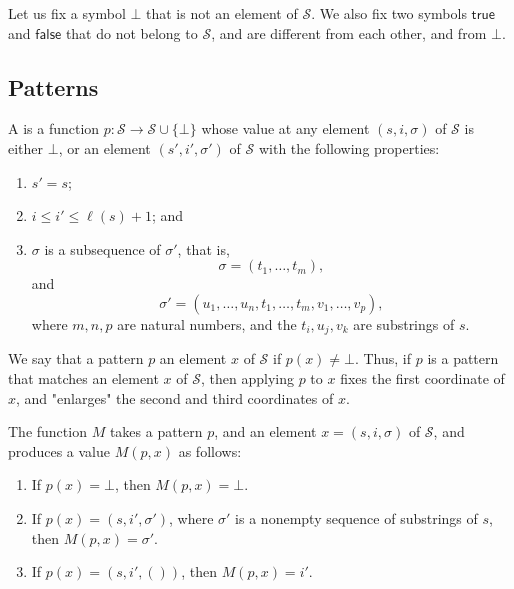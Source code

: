 \documentclass{article}
\begin{document}
Let us fix a symbol \(\bot\) that is not an element of
\(\mathcal{S}\).  We also fix two symbols \(\mathsf{true}\) and
\(\mathsf{false}\) that do not belong to \(\mathcal{S}\), and are
different from each other, and from \(\bot\).

\subsection{Patterns}
\label{sec:6sb55afv}

A  is a function
\(p : \mathcal{S} \to \mathcal{S} \cup \{\bot\}\) whose value at any
element \((s, i, \sigma)\) of \(\mathcal{S}\) is either \(\bot\), or
an element \((s', i', \sigma')\) of \(\mathcal{S}\) with the following
properties:
\begin{enumerate}
\item \(s' = s\);
\item \(i \leq i' \leq \ell(s) + 1\); and
\item \(\sigma\) is a subsequence of \(\sigma'\), that is,
  \begin{displaymath}
    \sigma = (t_1, \dotsc, t_m),
  \end{displaymath}
  and
  \begin{displaymath}
    \sigma' =
    (u_1, \dotsc, u_n, t_1, \dotsc, t_m, v_1, \dotsc, v_p),
  \end{displaymath}
  where \(m, n, p\) are natural numbers, and the \(t_i, u_j, v_k\) are
  substrings of \(s\).
\end{enumerate}

We say that a pattern \(p\)  an element \(x\) of
\(\mathcal{S}\) if \(p(x) \neq \bot\).  Thus, if \(p\) is a pattern
that matches an element \(x\) of \(\mathcal{S}\), then applying \(p\)
to \(x\) fixes the first coordinate of \(x\), and "enlarges" the
second and third coordinates of \(x\).

The  function \(M\) takes a pattern \(p\), and an
element \(x = (s, i, \sigma)\) of \(\mathcal{S}\), and produces a
value \(M(p, x)\) as follows:
\begin{enumerate}
\item If \(p(x) = \bot\), then \(M(p, x) = \bot\).
\item If \(p(x) = (s, i', \sigma')\), where \(\sigma'\) is a nonempty
  sequence of substrings of \(s\), then \(M(p, x) = \sigma'\).
\item If \(p(x) = (s, i', ())\), then \(M(p, x) = i'\).
\end{enumerate}
\end{document}
